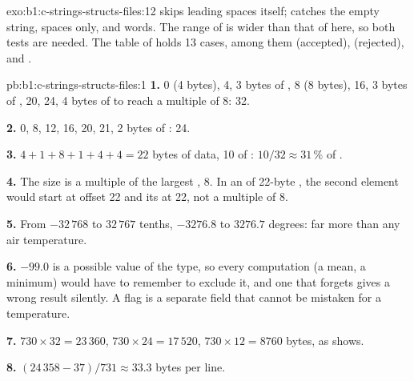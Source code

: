\begin{solution}{exo:b1:c-strings-structs-files:12}
 skips leading spaces itself;  catches the empty string, spaces only, and words. The range
of  is wider than that of  here, so both tests are needed. The table of
 holds 13 cases, among them  (accepted),  (rejected),
 and .
\end{solution}

\begin{solution}{pb:b1:c-strings-structs-files:1}
\textbf{1.}  0 (4 bytes),  4, 3 bytes of ,  8 (8 bytes),  16,
3 bytes of ,  20,  24, 4 bytes of  to reach a multiple of 8: 32.

\textbf{2.}  0,  8,  12,  16,  20,  21, 2 bytes of
: 24.

\textbf{3.} $4 + 1 + 8 + 1 + 4 + 4 = 22$ bytes of data, 10 of : $10/32 \approx 31\,\%$ of .

\textbf{4.} The size is a multiple of the largest , 8. In an  of 22-byte , the second element
would start at offset 22 and its  at 22, not a multiple of 8.

\textbf{5.} From $-32\,768$ to $32\,767$ tenths, $-3276.8$ to $3276.7$ degrees: far more than any air temperature.

\textbf{6.} $-99.0$ is a possible value of the type, so every computation (a mean, a minimum) would have to remember to
exclude it, and one that forgets gives a wrong result silently. A flag is a separate field that cannot be mistaken for
a temperature.

\textbf{7.} $730 \times 32 = 23\,360$, $730 \times 24 = 17\,520$, $730 \times 12 = 8760$ bytes, as  shows.

\textbf{8.} $(24\,358 - 37)/731 \approx 33.3$ bytes per line.


\end{solution}
